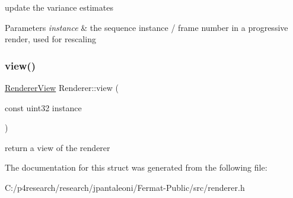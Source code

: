 update the variance estimates


\begin{DoxyParams}{Parameters}
{\em instance} & the sequence instance / frame number in a progressive render, used for rescaling \\
\hline
\end{DoxyParams}
\mbox{\label{struct_renderer_abf4fa769e2ab796aa38791cf0e6d826c}} 
\subsubsection{\texorpdfstring{view()}{view()}}
{\footnotesize\ttfamily \hyperlink{struct_renderer_view}{Renderer\+View} Renderer\+::view (\begin{DoxyParamCaption}\item[{const uint32}]{instance }\end{DoxyParamCaption})}

return a view of the renderer 

The documentation for this struct was generated from the following file\+:\begin{DoxyCompactItemize}
\item 
C\+:/p4research/research/jpantaleoni/\+Fermat-\/\+Public/src/renderer.\+h\end{DoxyCompactItemize}
